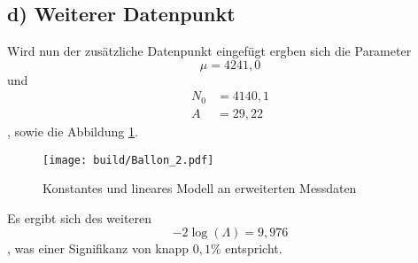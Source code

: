\subsection*{d) Weiterer Datenpunkt}
Wird nun der zusätzliche Datenpunkt eingefügt ergben sich die Parameter
\begin{equation}
    \mu=4241,0
\end{equation}
und
\begin{align}
    N_0 &= 4140,1\\
    A   &= 29,22
\end{align}
, sowie die Abbildung \ref{fig:Ballon_2}.
\begin{figure}
    \centering
    \texttt{[image: build/Ballon\_2.pdf]}
    \caption{Konstantes und lineares Modell an erweiterten Messdaten}
    \label{fig:Ballon_2}
\end{figure}
Es ergibt sich des weiteren
\begin{equation}
    -2\log(\Lambda)=9,976
\end{equation}
, was einer Signifikanz von knapp $0,1\%$ entspricht.